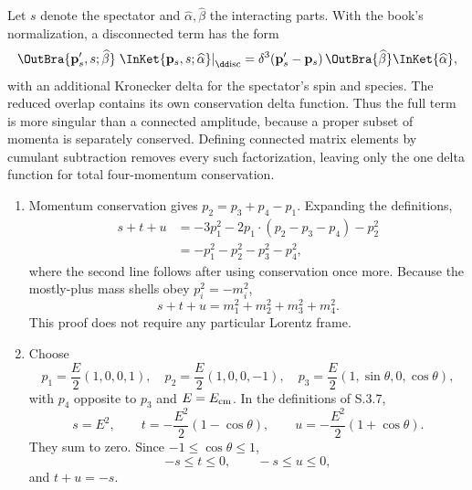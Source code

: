 \begin{enumerate}
Let \(s\) denote the spectator and \(\widehat\alpha,\widehat\beta\) the
interacting parts.  With the book's normalization, a disconnected term
has the form
\[
 \OutBra{\mathbf p'_s,s;\widehat\beta}
 \left.\InKet{\mathbf p_s,s;\widehat\alpha}\right|_{\rm \dd isc}
 =\delta^3(\mathbf p'_s-\mathbf p_s)\,
 \OutBra{\widehat\beta}\InKet{\widehat\alpha},
\]
with an additional Kronecker delta for the spectator's spin and species.
The reduced overlap contains its own conservation delta function.  Thus
the full term is more singular than a connected amplitude, because a
proper subset of momenta is separately conserved.  Defining connected
matrix elements by cumulant subtraction removes every such factorization,
leaving only the one delta function for total four-momentum conservation.

\begin{enumerate}
\item
Momentum conservation gives \(p_2=p_3+p_4-p_1\).  Expanding the
definitions,
\[
 \begin{split}
 s+t+u
 &=-3p_1^2-2p_1\cdot(p_2-p_3-p_4)-p_2^2\\
 &=-p_1^2-p_2^2-p_3^2-p_4^2,
 \end{split}
\]
where the second line follows after using conservation once more.
Because the mostly-plus mass shells obey \(p_i^2=-m_i^2\),
\[
 s+t+u=m_1^2+m_2^2+m_3^2+m_4^2.
\]
This proof does not require any particular Lorentz frame.
\item
Choose
\[
 p_1=\frac E2(1,0,0,1),\quad
 p_2=\frac E2(1,0,0,-1),\quad
 p_3=\frac E2(1,\sin\theta,0,\cos\theta),
\]
with \(p_4\) opposite to \(p_3\) and \(E=E_{\rm cm}\).  In the definitions
of S.3.7,
\[
 s=E^2,\qquad
 t=-\frac{E^2}{2}(1-\cos\theta),\qquad
 u=-\frac{E^2}{2}(1+\cos\theta).
\]
They sum to zero.  Since \(-1\leq\cos\theta\leq1\),
\[
 -s\leq t\leq0,\qquad -s\leq u\leq0,
\]
and \(t+u=-s\).
\end{enumerate}


\end{enumerate}
